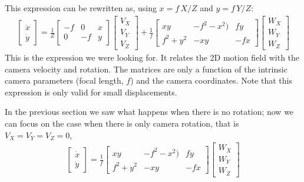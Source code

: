 This expression can be rewritten as, using $x=f \, X/Z$ and $y=f \, Y/Z$:
\begin{align}
    \begin{bmatrix}
        \dot{x} \\
        \dot{y}
    \end{bmatrix}
    = \frac{1}{Z}
    \begin{bmatrix}
        -f & 0  & x \\
        0  & -f & y
    \end{bmatrix}
    \begin{bmatrix}
        V_X \\
        V_Y \\
        V_Z
    \end{bmatrix}
    +
    \frac{1}{f}
    \begin{bmatrix}
        xy      & -f^2-x^2) & f y  \\
        f^2+y^2 & -xy       & -f x
    \end{bmatrix}
    \begin{bmatrix}
        W_X \\
        W_Y \\
        W_Z
    \end{bmatrix}
    \label{eq:2d_motion_field_from_translation_and_rotation}
\end{align}
This is the expression we were looking for. It relates the 2D motion field with the camera velocity and rotation. The matrices are only a function of the intrinsic camera parameters (focal length, $f$) and the camera coordinates. Note that this expression is only valid for small displacements.

In the previous section we saw what happens when there is no rotation; now we can focus on the case when there is only camera rotation, that is $V_X=V_Y=V_Z=0$,
\begin{align}
    \begin{bmatrix}
        \dot{x} \\
        \dot{y}
    \end{bmatrix}
    =
    \frac{1}{f}
    \begin{bmatrix}
        xy      & -f^2-x^2) & f y  \\
        f^2+y^2 & -xy       & -f x
    \end{bmatrix}
    \begin{bmatrix}
        W_X \\
        W_Y \\
        W_Z
    \end{bmatrix}
\end{align}

